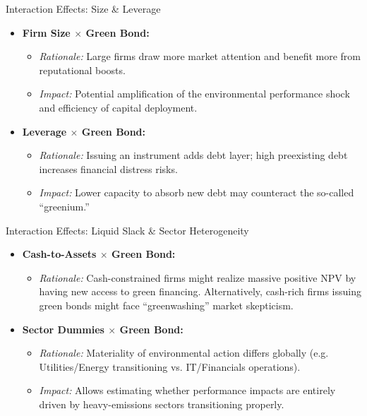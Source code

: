 \documentclass[aspectratio=169, 10pt]{beamer}
\begin{document}
\begin{frame}{Interaction Effects: Size \& Leverage}
    \begin{itemize}
        \item \textbf{Firm Size $\times$ Green Bond:}
        \begin{itemize}
            \item \textit{Rationale:} Large firms draw more market attention and benefit more from reputational boosts. 
            \item \textit{Impact:} Potential amplification of the environmental performance shock and efficiency of capital deployment.
        \end{itemize}
        \vspace{0.3cm}
        \item \textbf{Leverage $\times$ Green Bond:}
        \begin{itemize}
            \item \textit{Rationale:} Issuing an instrument adds debt layer; high preexisting debt increases financial distress risks.
            \item \textit{Impact:} Lower capacity to absorb new debt may counteract the so-called ``greenium.''
        \end{itemize}
    \end{itemize}
\end{frame}

\begin{frame}{Interaction Effects: Liquid Slack \& Sector Heterogeneity}
    \begin{itemize}
        \item \textbf{Cash-to-Assets $\times$ Green Bond:}
        \begin{itemize}
            \item \textit{Rationale:} Cash-constrained firms might realize massive positive NPV by having new access to green financing. Alternatively, cash-rich firms issuing green bonds might face ``greenwashing'' market skepticism.
        \end{itemize}
        \vspace{0.3cm}
        \item \textbf{Sector Dummies $\times$ Green Bond:}
        \begin{itemize}
            \item \textit{Rationale:} Materiality of environmental action differs globally (e.g. Utilities/Energy transitioning vs. IT/Financials operations).
            \item \textit{Impact:} Allows estimating whether performance impacts are entirely driven by heavy-emissions sectors transitioning properly.
        \end{itemize}
    \end{itemize}
\end{frame}
\end{document}
